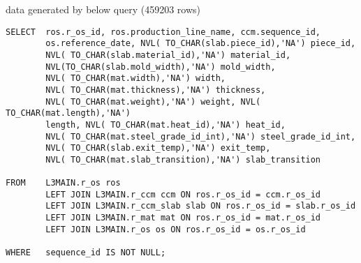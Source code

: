 \documentclass{article}
\begin{document}
data generated by below query (459203 rows)

\begin{lstlisting}
SELECT  ros.r_os_id, ros.production_line_name, ccm.sequence_id,        
        os.reference_date, NVL( TO_CHAR(slab.piece_id),'NA') piece_id, 
        NVL( TO_CHAR(slab.material_id),'NA') material_id, 
        NVL(TO_CHAR(slab.mold_width),'NA') mold_width, 
        NVL( TO_CHAR(mat.width),'NA') width, 
        NVL( TO_CHAR(mat.thickness),'NA') thickness, 
        NVL( TO_CHAR(mat.weight),'NA') weight, NVL( TO_CHAR(mat.length),'NA')
        length, NVL( TO_CHAR(mat.heat_id),'NA') heat_id, 
        NVL( TO_CHAR(mat.steel_grade_id_int),'NA') steel_grade_id_int, 
        NVL( TO_CHAR(slab.exit_temp),'NA') exit_temp, 
        NVL( TO_CHAR(mat.slab_transition),'NA') slab_transition

FROM   	L3MAIN.r_os ros 
        LEFT JOIN L3MAIN.r_ccm ccm ON ros.r_os_id = ccm.r_os_id 
        LEFT JOIN L3MAIN.r_ccm_slab slab ON ros.r_os_id = slab.r_os_id 
        LEFT JOIN L3MAIN.r_mat mat ON ros.r_os_id = mat.r_os_id 
        LEFT JOIN L3MAIN.r_os os ON ros.r_os_id = os.r_os_id

WHERE  	sequence_id IS NOT NULL;
\end{lstlisting}
\end{document}
